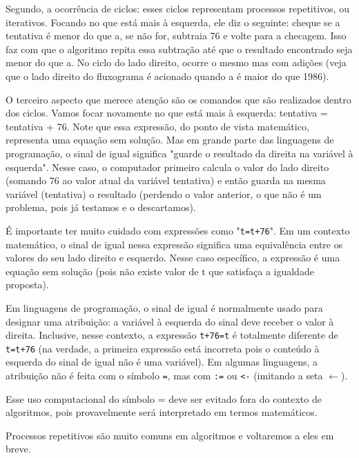 Segundo, a ocorrência de ciclos: esses ciclos representam processos repetitivos, ou iterativos. Focando no que está mais à esquerda, ele diz o seguinte: cheque se a tentativa é menor do que a, se não for, subtraia 76 e volte para a checagem. Isso faz com que o algoritmo repita essa subtração até que o resultado encontrado seja menor do que a. No ciclo do lado direito, ocorre o mesmo mas com adições (veja que o lado direito do fluxograma é acionado quando a é maior do que 1986).

O terceiro aspecto que merece atenção são os comandos que são realizados dentro dos ciclos. Vamos focar novamente no que está mais à esquerda: tentativa = tentativa + 76. Note que essa expressão, do ponto de vista matemático, representa uma equação sem solução. Mas em grande parte das linguagens de programação, o sinal de igual significa "guarde o resultado da direita na variável à esquerda". Nesse caso, o computador primeiro calcula o valor do lado direito (somando 76 ao valor atual da variável tentativa) e então guarda na mesma variável (tentativa) o resultado (perdendo o valor anterior, o que não é um problema, pois já testamos e o descartamos).

\begin{observation}{}
É importante ter muito cuidado com expressões como "\verb|t=t+76|". Em um contexto matemático, o sinal de igual nessa expressão significa uma equivalência entre os valores do seu lado direito e esquerdo. Nesse caso específico, a expressão é uma equação sem solução (pois não existe valor de t que satisfaça a igualdade proposta).

Em linguagens de programação, o sinal de igual é normalmente usado para designar uma atribuição: a variável à esquerda do sinal deve receber o valor à direita. Inclusive, nesse contexto, a expressão \verb|t+76=t| é totalmente diferente de \verb|t=t+76| (na verdade, a primeira expressão está incorreta pois o conteúdo à esquerda do sinal de igual não é uma variável). Em algumas linguagens, a atribuição não é feita com o símbolo \verb|=|, mas com \verb|:=| ou \verb|<-| (imitando a seta $\leftarrow$).

Esse uso computacional do símbolo = deve ser evitado fora do contexto de algoritmos, pois provavelmente será interpretado em termos matemáticos.
\end{observation}

Processos repetitivos são muito comuns em algoritmos e voltaremos a eles em breve.

\label{comp-know1}

